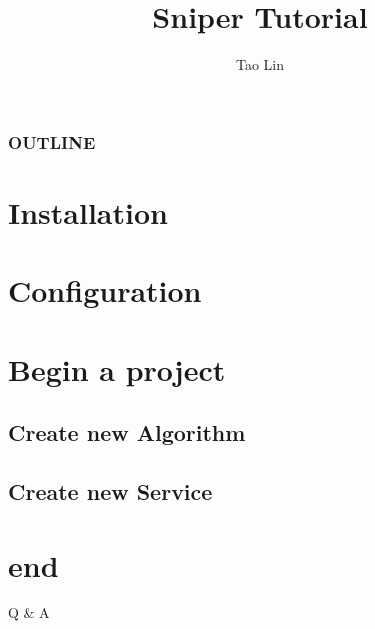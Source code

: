 \documentclass{beamer}
\begin{document}
\title{Sniper Tutorial}
\author{
    \texorpdfstring{Tao Lin
                    \newline
                    \href{mailto:lintao@ihep.ac.cn}
                    {\footnotesize{}}}
                    {Lin Tao}
}


\maketitle

\begin{frame}
    \frametitle{OUTLINE}
    \tableofcontents
\end{frame}

\section{Installation}
    
\section{Configuration}
    
\section{Begin a project}
    
\subsection{Create new Algorithm}
    
\subsection{Create new Service}
    

\section*{end}
\begin{frame}
    \begin{center}
        \LARGE Q \& A
    \end{center}
\end{frame}
\end{document}
